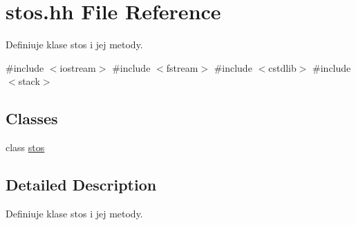 \hypertarget{stos_8hh}{\section{stos.\-hh \-File \-Reference}
\label{stos_8hh}
}


\-Definiuje klase stos i jej metody.  


{\ttfamily \#include $<$iostream$>$}\*
{\ttfamily \#include $<$fstream$>$}\*
{\ttfamily \#include $<$cstdlib$>$}\*
{\ttfamily \#include $<$stack$>$}\*
\subsection*{\-Classes}
\begin{DoxyCompactItemize}
\item 
class \hyperlink{classstos}{stos}
\end{DoxyCompactItemize}


\subsection{\-Detailed \-Description}
\-Definiuje klase stos i jej metody. 